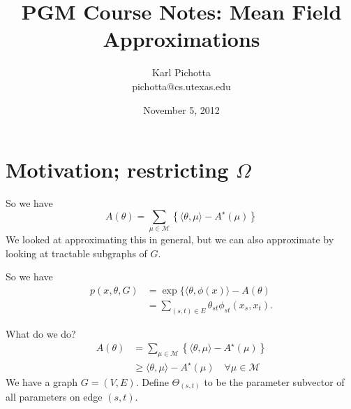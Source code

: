 \documentclass{article}
\title{PGM Course Notes: Mean Field Approximations}
\author{Karl Pichotta \\ pichotta@cs.utexas.edu}
\date{November 5, 2012}
\newcommand{\M}{\mathcal{M}}
\begin{document}
\maketitle

%
%
%
%
%

\section{Motivation; restricting $\Omega$}

So we have
$$
A(\theta) = 
\sum_{\mu\in\M}
\left\{
\langle\theta,\mu\rangle
- 
A^\star(\mu)
\right\}
$$
We looked at approximating this in general, but we can also approximate by looking at tractable subgraphs of $G$.

So we have
\begin{align}
p(x,\theta,G)
&=
\exp\{
\langle \theta, \phi(x)\rangle
- A(\theta)
\\
&=
\sum_{(s,t)\in E}\theta_{st} \phi_{st} (x_s, x_t).
\end{align}

What do we do?
\begin{align}
A(\theta) &= 
\sum_{\mu\in\M}
\left\{
\langle\theta,\mu\rangle
- 
A^\star(\mu)
\right\}
\\
& \geq 
\langle \theta, \mu\rangle - A^\star(\mu)
\quad
\forall \mu\in\M
\end{align}
We have a graph $G=(V,E)$.
Define $\Theta_{(s,t)}$ to be the parameter subvector of all parameters on edge $(s,t)$.
\end{document}
